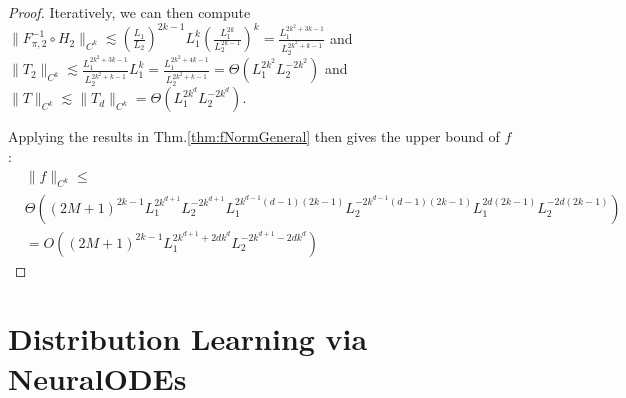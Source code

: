 \begin{proof}
Iteratively, we can then compute $\|F^{-1}_{\pi, 2}\circ H_2\|_{C^k} \lesssim (\frac{L_1}{L_2})^{2k-1}L_1^k(\frac{L_1^{2k}}{L_2^{2k-1}})^k = \frac{L_1^{2k^2 + 3k -1}}{L_2^{2k^2 + k - 1}}$ and $\|T_2\|_{C^k} \lesssim \frac{L_1^{2k^2 + 3k -1}}{L_2^{2k^2 + k - 1}}L_1^k = \frac{L_1^{2k^2 + 4k -1}}{L_2^{2k^2 + k - 1}} = \Theta(L_1^{2k^2}L_2^{-2k^2})$ and $\|T\|_{C^k}\lesssim \|T_d\|_{C^k} = \Theta(L_1^{2k^d}L_2^{-2k^d})$.

Applying the results in Thm.\ref{thm:fNormGeneral} then gives the upper bound of $f$:
\begin{align*}
&\|f\|_{C^k} \leq\\ &\Theta\left((2M+1)^{2k-1}L_1^{2k^{d+1}}L_2^{-2k^{d+1}}L_1^{2k^{d-1}(d-1)(2k-1)}L_2^{-2k^{d-1}(d-1)(2k-1)}L_1^{2d(2k-1)}L_2^{-2d(2k-1)}\right)\\
&= O\left((2M+1)^{2k-1}L_1^{2k^{d+1}+2dk^{d}}L_2^{-2k^{d+1}-2dk^{d}}\right)
\end{align*}





\end{proof}






















\section{Distribution Learning via NeuralODEs} 
